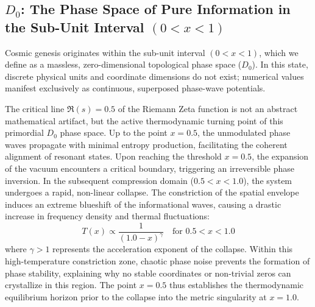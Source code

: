 \documentclass[11pt,a4paper]{article}
\theoremstyle{plain}
\theoremstyle{definition}
\theoremstyle{remark}
\begin{document}
\subsection{$D_0$: The Phase Space of Pure Information in the Sub-Unit Interval $(0 < x < 1)$}
Cosmic genesis originates within the sub-unit interval $(0 < x < 1)$, which we define as a massless, zero-dimensional topological phase space ($D_0$). In this state, discrete physical units and coordinate dimensions do not exist; numerical values manifest exclusively as continuous, superposed phase-wave potentials.

The critical line $\mathfrak{R}(s) = 0.5$ of the Riemann Zeta function is not an abstract mathematical artifact, but the active thermodynamic turning point of this primordial $D_0$ phase space. Up to the point $x = 0.5$, the unmodulated phase waves propagate with minimal entropy production, facilitating the coherent alignment of resonant states. Upon reaching the threshold $x = 0.5$, the expansion of the vacuum encounters a critical boundary, triggering an irreversible phase inversion. In the subsequent compression domain ($0.5 < x < 1.0$), the system undergoes a rapid, non-linear collapse. The constriction of the spatial envelope induces an extreme blueshift of the informational waves, causing a drastic increase in frequency density and thermal fluctuations:
\begin{equation}
T(x) \propto \frac{1}{(1.0 - x)^{\gamma}} \quad \text{for } 0.5 < x < 1.0
\end{equation}
where $\gamma > 1$ represents the acceleration exponent of the collapse. Within this high-temperature constriction zone, chaotic phase noise prevents the formation of phase stability, explaining why no stable coordinates or non-trivial zeros can crystallize in this region. The point $x = 0.5$ thus establishes the thermodynamic equilibrium horizon prior to the collapse into the metric singularity at $x = 1.0$.
\end{document}
